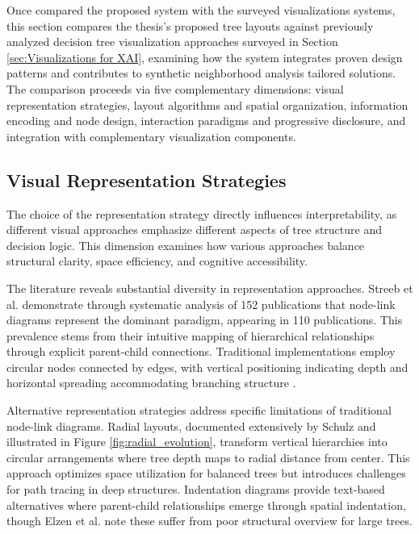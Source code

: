 



Once compared the proposed system with the surveyed visualizations systems, this section compares the thesis's proposed tree layouts against previously analyzed decision tree visualization approaches surveyed in Section \ref{sec:Visualizations for XAI}, examining how the system integrates proven design patterns and contributes to synthetic neighborhood analysis tailored solutions. The comparison proceeds via five complementary dimensions: visual representation strategies, layout algorithms and spatial organization, information encoding and node design, interaction paradigms and progressive disclosure, and integration with complementary visualization components.

\subsection{Visual Representation Strategies}

The choice of the representation strategy directly influences interpretability, as different visual approaches emphasize different aspects of tree structure and decision logic. This dimension examines how various approaches balance structural clarity, space efficiency, and cognitive accessibility.

The literature reveals substantial diversity in representation approaches. Streeb et al. \cite{Streeb2021TaskBasedVI} demonstrate through systematic analysis of 152 publications that node-link diagrams represent the dominant paradigm, appearing in 110 publications. This prevalence stems from their intuitive mapping of hierarchical relationships through explicit parent-child connections. Traditional implementations employ circular nodes connected by edges, with vertical positioning indicating depth and horizontal spreading accommodating branching structure \cite{schulz2011treevis, elzen2011baobabview}.

Alternative representation strategies address specific limitations of traditional node-link diagrams. Radial layouts, documented extensively by Schulz \cite{schulz2011treevis} and illustrated in Figure \ref{fig:radial_evolution}, transform vertical hierarchies into circular arrangements where tree depth maps to radial distance from center. This approach optimizes space utilization for balanced trees but introduces challenges for path tracing in deep structures. Indentation diagrams provide text-based alternatives where parent-child relationships emerge through spatial indentation, though Elzen et al. \cite{elzen2011baobabview} note these suffer from poor structural overview for large trees.

